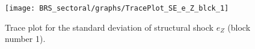 \begin{figure}[H]
\centering
  \texttt{[image: BRS\_sectoral/graphs/TracePlot\_SE\_e\_Z\_blck\_1]}\\
    \caption{Trace plot for the standard deviation of structural shock ${e_Z}$ (block number 1).}
\end{figure}
